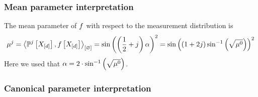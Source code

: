 \subsubsection{Mean parameter interpretation}

The mean parameter of $f$ with respect to the measurement distribution is
\begin{align*}
    \mu^{j}
    = \left\langle \mathbb{P}^{j}\left[X_{[d]}\right],f\left[X_{[d]}\right]\right\rangle_{\left[ \varnothing \right]}
    = \mathrm{sin}\left(\left(\frac{1}{2}+j\right)\alpha\right)^2
    = \mathrm{sin}\left(\left(1+2j\right)\sin^{-1}\left(\sqrt{\mu^{0}}\right)\right)^2
\end{align*}
Here we used that $\alpha = 2\cdot\sin^{-1}\left(\sqrt{\mu^{0}}\right)$.


\subsubsection{Canonical parameter interpretation}

%        



